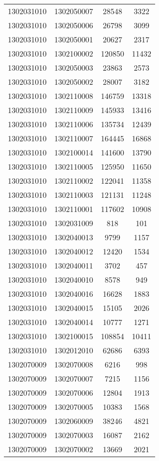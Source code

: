 \begin{longtable}[h]{llcc}
		1302031010 & 1302050007 & 28548 & 3322\\
		1302031010 & 1302050006 & 26798 & 3099\\
		1302031010 & 1302050001 & 20627 & 2317\\
		1302031010 & 1302100002 & 120850 & 11432\\
		1302031010 & 1302050003 & 23863 & 2573\\
		1302031010 & 1302050002 & 28007 & 3182\\
		1302031010 & 1302110008 & 146759 & 13318\\
		1302031010 & 1302110009 & 145933 & 13416\\
		1302031010 & 1302110006 & 135734 & 12439\\
		1302031010 & 1302110007 & 164445 & 16868\\
		1302031010 & 1302100014 & 141600 & 13790\\
		1302031010 & 1302110005 & 125950 & 11650\\
		1302031010 & 1302110002 & 122041 & 11358\\
		1302031010 & 1302110003 & 121131 & 11248\\
		1302031010 & 1302110001 & 117602 & 10908\\
		1302031010 & 1302031009 & 818 & 101\\
		1302031010 & 1302040013 & 9799 & 1157\\
		1302031010 & 1302040012 & 12420 & 1534\\
		1302031010 & 1302040011 & 3702 & 457\\
		1302031010 & 1302040010 & 8578 & 949\\
		1302031010 & 1302040016 & 16628 & 1883\\
		1302031010 & 1302040015 & 15105 & 2026\\
		1302031010 & 1302040014 & 10777 & 1271\\
		1302031010 & 1302100015 & 108854 & 10411\\
		1302031010 & 1302012010 & 62686 & 6393\\
		1302070009 & 1302070008 & 6216 & 998\\
		1302070009 & 1302070007 & 7215 & 1156\\
		1302070009 & 1302070006 & 12804 & 1913\\
		1302070009 & 1302070005 & 10383 & 1568\\
		1302070009 & 1302060009 & 38246 & 4821\\
		1302070009 & 1302070003 & 16087 & 2162\\
		1302070009 & 1302070002 & 13669 & 2021\\

\end{longtable}
